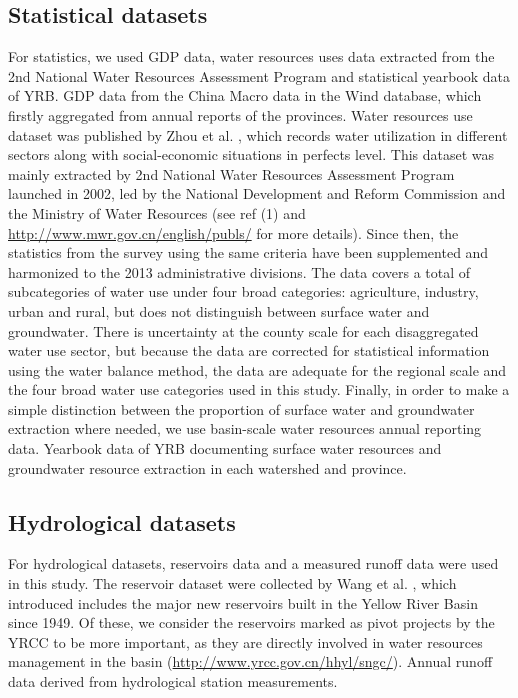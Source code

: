 \documentclass[9pt,twoside,lineno]{pnas-new}
\begin{document}
\subsection*{Statistical datasets}
For statistics, we used GDP data, water resources uses data extracted from the 2nd National Water Resources Assessment Program \cite{zhouDecelerationChinaHuman2020} and statistical yearbook data of YRB. GDP data from the China Macro data in the Wind database, which firstly aggregated from annual reports of the provinces. Water resources use dataset was published by Zhou et al. \cite{zhouDecelerationChinaHuman2020}, which records water utilization in different sectors along with social-economic situations in perfects level. This dataset was mainly extracted by 2nd National Water Resources Assessment Program launched in 2002, led by the National Development and Reform Commission and the Ministry of Water Resources (see ref (1) and \url{http://www.mwr.gov.cn/english/publs/} for more details). Since then, the statistics from the survey using the same criteria have been supplemented and harmonized to the 2013 administrative divisions. 
The data covers a total of subcategories of water use under four broad categories: agriculture, industry, urban and rural, but does not distinguish between surface water and groundwater. There is uncertainty at the county scale for each disaggregated water use sector, but because the data are corrected for statistical information using the water balance method, the data are adequate for the regional scale and the four broad water use categories used in this study.
Finally, in order to make a simple distinction between the proportion of surface water and groundwater extraction where needed, we use basin-scale water resources annual reporting data. Yearbook data of YRB documenting surface water resources and groundwater resource extraction in each watershed and province. 


\subsection*{Hydrological datasets}
For hydrological datasets, reservoirs data and a measured runoff data were used in this study.
The reservoir dataset were collected by Wang et al. \cite{wangYellowRiverWater2019}, which introduced includes the major new reservoirs built in the Yellow River Basin since 1949. Of these, we consider the reservoirs marked as pivot projects by the YRCC to be more important, as they are directly involved in water resources management in the basin (\url{http://www.yrcc.gov.cn/hhyl/sngc/}). Annual runoff data derived from hydrological station measurements.
\end{document}
